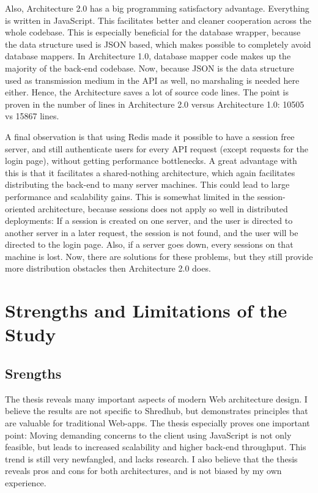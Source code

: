 Also, Architecture 2.0 has a big programming satisfactory advantage. Everything is written in JavaScript. This facilitates better and cleaner cooperation across the whole codebase. This is especially beneficial for the database wrapper, because the data structure used is JSON based, which makes possible to completely avoid database mappers. In Architecture 1.0, database mapper code makes up the majority of the back-end codebase. Now, because JSON is the data structure used as transmission medium in the API as well, no marshaling is needed here either. Hence, the Architecture saves a lot of source code lines. The point is proven in the number of lines in Architecture 2.0 versus Architecture 1.0: 10505 vs 15867 lines.

A final observation is that using Redis made it possible to have a session free server, and still authenticate users for every API request (except requests for the login page), without getting performance bottlenecks. A great advantage with this is that it facilitates a shared-nothing architecture, which again facilitates distributing the back-end to many server machines. This could lead to large performance and scalability gains. This is somewhat limited in the session-oriented architecture, because sessions does not apply so well in distributed deployments: If a session is created on one server, and the user is directed to another server in a later request, the session is not found, and the user will be directed to the login page. Also, if a server goes down, every sessions on that machine is lost. Now, there are solutions for these problems, but they still provide more distribution obstacles then Architecture 2.0 does. 

 

\section{Strengths and Limitations of the Study}
\subsection{Srengths}
The thesis reveals many important aspects of modern Web architecture design. I believe the results are not specific to Shredhub, but demonstrates principles that are valuable for traditional Web-apps. The thesis especially proves one important point: Moving demanding concerns to the client using JavaScript is not only feasible, but leads to increased scalability and higher back-end throughput. This trend is still very newfangled, and lacks research. I also believe that the thesis reveals pros and cons for both architectures, and is not biased by my own experience. 

